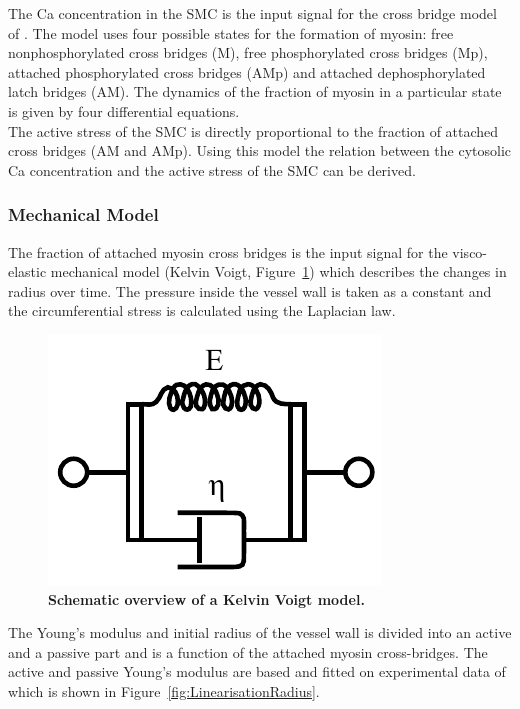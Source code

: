The \gls{Ca} concentration in the SMC is the input signal for the cross bridge model of \citet{Hai1989}. The model uses four possible states for the formation of myosin: free nonphosphorylated cross bridges (M), free phosphorylated cross bridges (Mp), attached phosphorylated cross bridges (AMp) and attached dephosphorylated latch bridges (AM). The dynamics of the fraction of myosin in a particular state is given by four differential equations.\\

The active stress of the SMC is directly proportional to the fraction of attached cross bridges (AM and AMp). Using this model the relation between the cytosolic \gls{Ca} concentration and the active stress of the SMC can be derived.\\

\subsubsection{Mechanical Model}
The fraction of attached myosin cross bridges is the input signal for the visco-elastic mechanical model (Kelvin Voigt, Figure~\ref{fig:KelvinVoigt})  which describes the changes in radius over time. The pressure inside the vessel wall is taken as a constant and the circumferential stress is calculated using the Laplacian law. 


\begin{figure}[h!]
  \centering
  \includegraphics[width = 5 cm]{pics/Kelvin_Voigt_diagram.pdf}
  \caption{\textbf{Schematic overview of a Kelvin Voigt model.}}
  \label{fig:KelvinVoigt}
\end{figure}

The Young's modulus and initial radius of the vessel wall is divided into an active and a passive part and is a function of the attached myosin cross-bridges. The active and passive Young's modulus are based and fitted on experimental data of \citet{Gore} which is shown in Figure~\ref{fig:LinearisationRadius}. 


